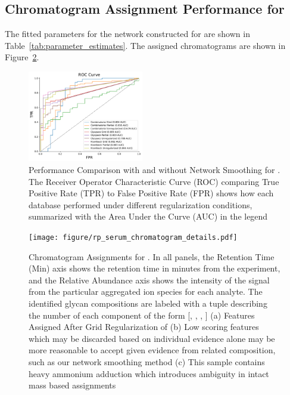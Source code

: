 \subsection{Chromatogram Assignment Performance for \rpserum}
    The fitted parameters for the network constructed for \rpserum are shown in
    Table~\ref{tab:parameter_estimates}. The assigned chromatograms are shown in
    Figure~\ref{fig:rpserum_assignments}.

    \begin{figure}[htb]
        \caption{Performance Comparison with and without Network Smoothing for \rpserum
                 \label{fig:rpserum_perf}. The Receiver Operator Characteristic Curve (ROC)
                 comparing True Positive Rate (TPR) to False Positive Rate (FPR) shows how
                 each database performed under different regularization conditions, summarized
                 with the Area Under the Curve (AUC) in the legend}
        \centering
        \includegraphics[width=0.45\textwidth,valign=t]{figure/serum_roc.pdf}
    \end{figure}

    \begin{figure}[tb]
        \texttt{[image: figure/rp\_serum\_chromatogram\_details.pdf]}
        \caption{Chromatogram Assignments for \rpserum. In all panels, the Retention Time (Min) axis shows
            the retention time in minutes from the experiment, and the Relative
            Abundance axis shows the intensity of the signal from the particular
            aggregated ion species for each analyte. The identified glycan compositions
            are labeled with a tuple describing the number of each component of the form
            [, , , ]
            (a) Features Assigned After Grid Regularization of \rpserum (b) Low scoring features
            which may be discarded based on individual evidence alone may be more reasonable to accept
            given evidence from related composition, such as our network smoothing method (c) This sample
            contains heavy ammonium adduction which introduces ambiguity in intact mass based assignments
            \label{fig:rpserum_assignments}
        }
    \end{figure}

